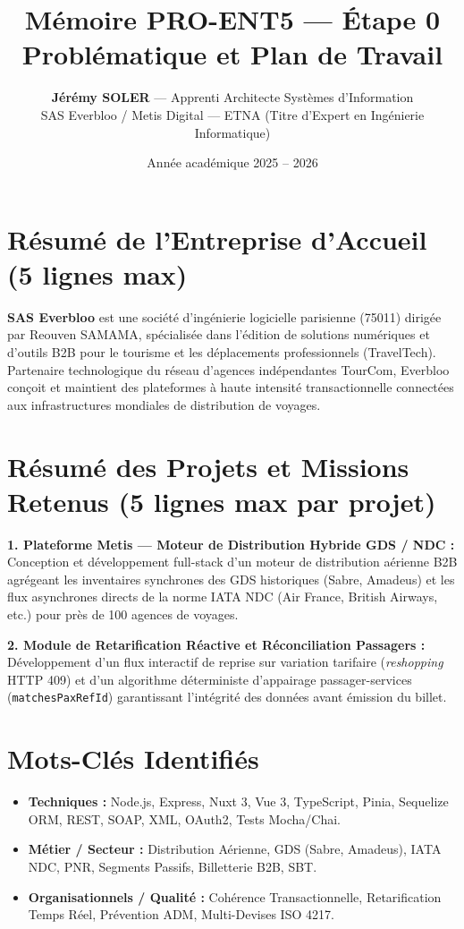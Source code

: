 \documentclass[11pt,a4paper]{article}
\title{\vspace{-1cm}\Huge\textbf{\textcolor{NavyBlue}{Mémoire PRO-ENT5 — Étape 0}}\\[6pt]
\Large\textbf{\textcolor{CobaltBlue}{Problématique et Plan de Travail}}}
\author{\textbf{Jérémy SOLER} — Apprenti Architecte Systèmes d'Information\\
SAS Everbloo / Metis Digital — ETNA (Titre d'Expert en Ingénierie Informatique)}
\date{Année académique 2025 -- 2026}
\begin{document}
\maketitle

\vspace{0.2cm}

\section{Résumé de l'Entreprise d'Accueil (5 lignes max)}
\textbf{SAS Everbloo} est une société d'ingénierie logicielle parisienne (75011) dirigée par Reouven SAMAMA, spécialisée dans l'édition de solutions numériques et d'outils B2B pour le tourisme et les déplacements professionnels (TravelTech). Partenaire technologique du réseau d'agences indépendantes TourCom, Everbloo conçoit et maintient des plateformes à haute intensité transactionnelle connectées aux infrastructures mondiales de distribution de voyages.

\section{Résumé des Projets et Missions Retenus (5 lignes max par projet)}
\noindent\textbf{1. Plateforme Metis — Moteur de Distribution Hybride GDS / NDC :}\\
Conception et développement full-stack d'un moteur de distribution aérienne B2B agrégeant les inventaires synchrones des GDS historiques (Sabre, Amadeus) et les flux asynchrones directs de la norme IATA NDC (Air France, British Airways, etc.) pour près de 100 agences de voyages.

\vspace{0.2cm}
\noindent\textbf{2. Module de Retarification Réactive et Réconciliation Passagers :}\\
Développement d'un flux interactif de reprise sur variation tarifaire (\textit{reshopping} HTTP 409) et d'un algorithme déterministe d'appairage passager-services (\texttt{matchesPaxRefId}) garantissant l'intégrité des données avant émission du billet.

\section{Mots-Clés Identifiés}
\begin{itemize}[itemsep=2pt]
    \item \textbf{Techniques :} Node.js, Express, Nuxt 3, Vue 3, TypeScript, Pinia, Sequelize ORM, REST, SOAP, XML, OAuth2, Tests Mocha/Chai.
    \item \textbf{Métier / Secteur :} Distribution Aérienne, GDS (Sabre, Amadeus), IATA NDC, PNR, Segments Passifs, Billetterie B2B, SBT.
    \item \textbf{Organisationnels / Qualité :} Cohérence Transactionnelle, Retarification Temps Réel, Prévention ADM, Multi-Devises ISO 4217.
\end{itemize}
\end{document}
